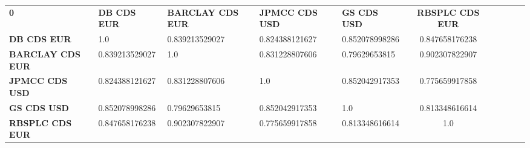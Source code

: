 \begin{tabular}{|l|l|l|l|l|c|c|c|c|c|}
\hline
\textbf{0} & \textbf{DB CDS EUR} & \textbf{BARCLAY CDS EUR} & \textbf{JPMCC CDS USD} & \textbf{GS CDS USD} & \textbf{RBSPLC CDS EUR}\\\hhline{|=|=|=|=|=|=|}
\textbf{DB CDS EUR} & 1.0 & 0.839213529027 & 0.824388121627 & 0.852078998286 & 0.847658176238\\
\textbf{BARCLAY CDS EUR} & 0.839213529027 & 1.0 & 0.831228807606 & 0.79629653815 & 0.902307822907\\
\textbf{JPMCC CDS USD} & 0.824388121627 & 0.831228807606 & 1.0 & 0.852042917353 & 0.775659917858\\
\textbf{GS CDS USD} & 0.852078998286 & 0.79629653815 & 0.852042917353 & 1.0 & 0.813348616614\\
\textbf{RBSPLC CDS EUR} & 0.847658176238 & 0.902307822907 & 0.775659917858 & 0.813348616614 & 1.0\\
\hline
\end{tabular}
